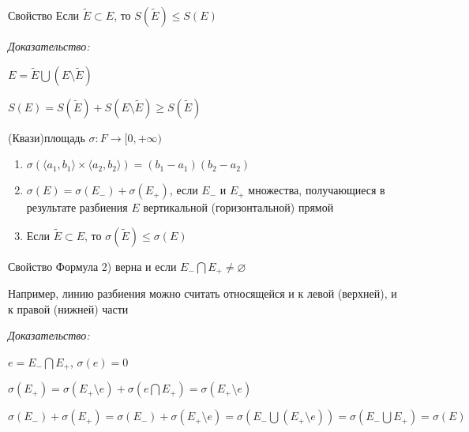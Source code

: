 \documentclass[12pt]{article}
\newcommand{\q}[1]{\langle #1 \rangle}
\begin{document}
\begin{theo}{Свойство}
    Если $\tilde{E} \subset E$, то $S(\tilde{E}) \leq S(E)$
\end{theo}

\textit{Доказательство:}

$E = \tilde{E} \bigcup (E \setminus \tilde{E})$

$S(E) = S(\tilde{E}) + S(E \setminus \tilde{E}) \geq S(\tilde{E})$

\begin{defin}{(Квази)площадь}
    $\sigma : F \rightarrow [0, +\infty)$

    \begin{enumerate}
        \item $\sigma(\q{a_1, b_1} \times \q{a_2, b_2}) = (b_1 - a_1)(b_2 - a_2)$
        \item $\sigma(E) = \sigma(E_-) + \sigma(E_+)$, если $E_-$ и $E_+$ множества, получающиеся в результате разбиения $E$ вертикальной (горизонтальной) прямой
        \item Если $\tilde{E} \subset E$, то $\sigma(\tilde{E}) \leq \sigma(E)$
    \end{enumerate}
\end{defin}

\begin{Remark}{Свойство}
    Формула 2) верна и если $E_- \bigcap E_+ \neq \varnothing$

    Например, линию разбиения можно считать относящейся и к левой (верхней), и к правой (нижней) части
\end{Remark}

\textit{Доказательство:}

$e = E_- \bigcap E_+$, $\sigma(e) = 0$

$\sigma(E_+) = \sigma(E_+ \setminus e) + \sigma(e \bigcap E_+) = \sigma(E_+ \setminus e)$

$\sigma(E_-) + \sigma(E_+) = \sigma(E_-) + \sigma(E_+ \setminus e) = \sigma(E_- \bigcup (E_+ \setminus e)) = \sigma(E_- \bigcup E_+) = \sigma(E)$
\end{document}

